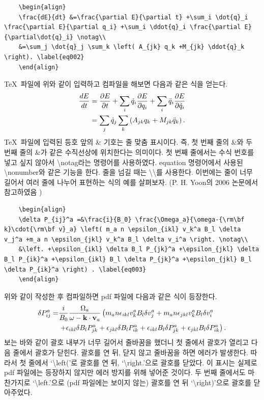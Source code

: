 \documentclass[twoside,11pt]{gshs_thesis}
\begin{document}
\begin{lstlisting}
	\begin{align}
	\frac{dE}{dt} &=\frac{\partial E}{\partial t} +\sum_i \dot{q}_i \frac{\partial E}{\partial q_i} +\sum_i \ddot{q}_i \frac{\partial E}{\partial\dot{q}_i} \notag\\
	&=\sum_j \dot{q}_j \sum_k \left( A_{jk} q_k +M_{jk} \ddot{q}_k \right). \label{eq002}
	\end{align}
\end{lstlisting}
\TeX\ 파일에 위와 같이 입력하고 컴파일을 해보면 다음과 같은 식을 얻는다.
\begin{align}
\frac{dE}{dt} &=\frac{\partial E}{\partial t} +\sum_i \dot{q}_i \frac{\partial E}{\partial q_i} +\sum_i \ddot{q}_i \frac{\partial E}{\partial\dot{q}_i} \notag\\
&=\sum_j \dot{q}_j \sum_k \left( A_{jk} q_k +M_{jk} \ddot{q}_k \right). \label{eq002}
\end{align}
\TeX\ 파일에 입력된 등호 앞의 \& 기호는 줄 맞춤 표시이다. 즉, 첫 번째 줄의 \&와 두 번째 줄의 \&가 같은 수직선상에 위치한다는 의미이다. 첫 번째 줄에서는 수식 번호를 넣고 싶지 않아서 {\textbackslash}notag라는 명령어를 사용하였다. equation 명령어에서 사용된 {\textbackslash}nonumber와 같은 기능을 한다. 줄을 넘길 때는 {\textbackslash}{\textbackslash}를 사용한다. 이번에는 줄이 너무 길어서 여러 줄에 나누어 표현하는 식의 예를 살펴보자. (P. H. Yoon의 2006 논문에서 참고하였음 \cite{Yoon06})
\begin{lstlisting}
	\begin{align}
	\delta P_{ij}^a =&\frac{i}{B_0} \frac{\Omega_a}{\omega-{\rm\bf k}\cdot{\rm\bf v}_a} \left( m_a n \epsilon_{ikl} v_k^a B_l \delta v_j^a +m_a n \epsilon_{jkl} v_k^a B_l \delta v_i^a \right. \notag\\
	&\left. +\epsilon_{ikl} \delta B_l P_{jk}^a +\epsilon_{jkl} \delta B_l P_{ik}^a +\epsilon_{ikl} B_l \delta P_{jk}^a +\epsilon_{jkl} B_l \delta P_{ik}^a \right) . \label{eq003}
	\end{align}
\end{lstlisting}
위와 같이 작성한 후 컴파일하면 pdf 파일에 다음과 같은 식이 등장한다.
\begin{align}
\delta P_{ij}^a =&\frac{i}{B_0} \frac{\Omega_a}{\omega-{\rm\bf k}\cdot{\rm\bf v}_a} \left( m_a n \epsilon_{ikl} v_k^a B_l \delta v_j^a +m_a n \epsilon_{jkl} v_k^a B_l \delta v_i^a \right. \notag\\
&\left. +\epsilon_{ikl} \delta B_l P_{jk}^a +\epsilon_{jkl} \delta B_l P_{ik}^a +\epsilon_{ikl} B_l \delta P_{jk}^a +\epsilon_{jkl} B_l \delta P_{ik}^a \right) . \label{eq003}
\end{align}
보는 바와 같이 괄호 내부가 너무 길어서 줄바꿈을 했더니 첫 줄에서 괄호가 열리고 다음 줄에서 괄호가 닫힌다.  괄호를 연 뒤, 닫지 않고 줄바꿈을 하면 에러가 발생한다. 따라서 첫 줄에서 `{\textbackslash}left('로 괄호를 연 뒤, `{\textbackslash}right.'으로 괄호를 닫았다. 이 표시는 실제로 pdf 파일에는 등장하지 않지만 에러 방지를 위해 넣어준 것이다. 두 번째 줄에서도 마찬가지로 `{\textbackslash}left.'으로 (pdf 파일에는 보이지 않는) 괄호를 연 뒤 `{\textbackslash}right)'으로 괄호를 닫아주었다.
\end{document}
